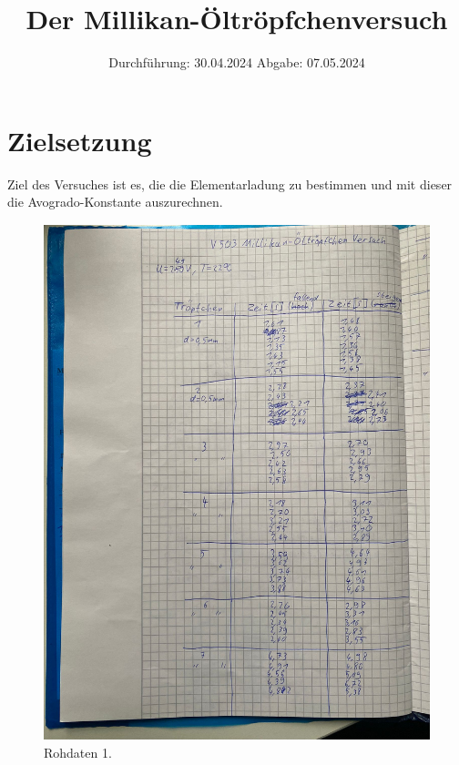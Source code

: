 

\subject{V503}
\title{Der Millikan-Öltröpfchenversuch}
\date{%
  Durchführung: 30.04.2024
  \hspace{3em}
  Abgabe: 07.05.2024
}



\maketitle
\thispagestyle{empty}
\tableofcontents
\newpage

\section{Zielsetzung}
Ziel des Versuches ist es, die die Elementarladung zu bestimmen und mit dieser die Avogrado-Konstante auszurechnen.






\printbibliography{}

\begin{figure}[H]
  \includegraphics[width=\textwidth, height=15cm]{Bilder/rohdaten1.jpg}
  \caption{Rohdaten 1.}
\end{figure}

